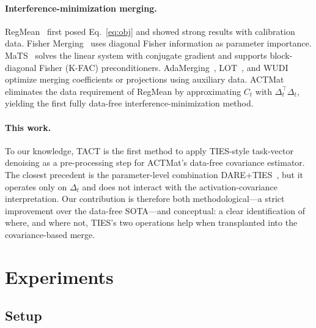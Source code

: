 \documentclass{article}
\theoremstyle{plain}
\theoremstyle{definition}
\theoremstyle{remark}
\begin{document}
\paragraph{Interference-minimization merging.} RegMean~\citep{jin2023dataless} first posed Eq.~\eqref{eq:obj} and showed strong results with calibration data. Fisher Merging~\citep{matena2022merging} uses diagonal Fisher information as parameter importance. MaTS~\citep{tam2024matsmerging} solves the linear system with conjugate gradient and supports block-diagonal Fisher (K-FAC) preconditioners. AdaMerging~\citep{yang2024adamerging}, LOT~\citep{sun2025lot}, and WUDI~\citep{cheng2025wudi} optimize merging coefficients or projections using auxiliary data. ACTMat~\citep{hameed2026actmat} eliminates the data requirement of RegMean by approximating $C_t$ with $\Delta_t^\top \Delta_t$, yielding the first fully data-free interference-minimization method.

\paragraph{This work.} To our knowledge, TACT is the first method to apply TIES-style task-vector denoising as a pre-processing step for ACTMat's data-free covariance estimator. The closest precedent is the parameter-level combination DARE+TIES~\citep{yu2024language}, but it operates only on $\Delta_t$ and does not interact with the activation-covariance interpretation. Our contribution is therefore both methodological---a strict improvement over the data-free SOTA---and conceptual: a clear identification of where, and where not, TIES's two operations help when transplanted into the covariance-based merge.

\section{Experiments}
\label{sec:exp}

\subsection{Setup}
\label{sec:exp_setup}
\end{document}
